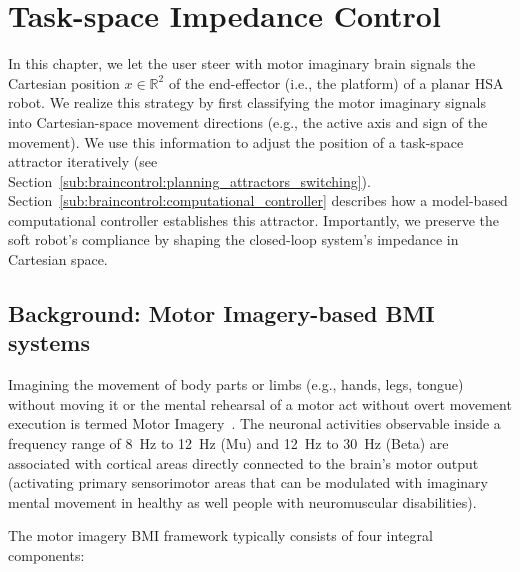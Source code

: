 \section{Task-space Impedance Control}
In this chapter, we let the user steer with motor imaginary brain signals the Cartesian position $x \in \mathbb{R}^2$ of the end-effector (i.e., the platform) of a planar \gls{HSA} robot.
We realize this strategy by first classifying the motor imaginary signals into Cartesian-space movement directions (e.g., the active axis and sign of the movement). We use this information to adjust the position of a task-space attractor iteratively (see Section~\ref{sub:braincontrol:planning_attractors_switching}). Section~\ref{sub:braincontrol:computational_controller} describes how a model-based computational controller establishes this attractor. Importantly, we preserve the soft robot's compliance by shaping the closed-loop system's impedance in Cartesian space.


\subsection{Background: Motor Imagery-based BMI systems}\label{sub:braincontrol:motor_imagery_bmi}

Imagining the movement of body parts or limbs (e.g., hands, legs, tongue) without moving it or the mental rehearsal of a motor act without overt movement execution is termed Motor Imagery~\cite{lotze2006motor}.  The neuronal activities observable inside a frequency range of \SI{8}{Hz} to \SI{12}{Hz} (Mu) and \SI{12}{Hz} to \SI{30}{Hz} (Beta) are associated with cortical areas directly connected to the brain’s motor output (activating primary sensorimotor areas that can be modulated with imaginary mental movement in healthy as well people with neuromuscular disabilities). 

The motor imagery \gls{BMI} framework typically consists of four integral components:

